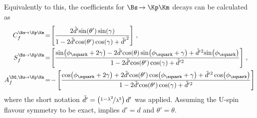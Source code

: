 Equivalently to this, the \CP coefficients for $\Bs\!\to\Kp\Km$ decays can be calculated as
\begin{equation}
\begin{aligned}
C_{f}^{\Bs\!\to\Kp\Km}&\!=\!\left[\frac{2\tilde{d'}\!\sin\!\left(\theta'\right)\sin\!\left(\gamma\right)}{1-2\tilde{d'}\!\cos\!\left(\theta'\right)\cos\!\left(\gamma\right)+\tilde{d'}^2}\right]\,,\\
S_{f}^{\Bs\!\to\Kp\Km}&\!=\!\left[\frac{\sin\!\left(\phi_\squark+2\gamma\right)-2\tilde{d'}\!\cos\!\left(\theta\right)\sin\!\left(\phi_\squark+\gamma\right)+\tilde{d'}{}^2\!\sin\!\left(\phi_\squark\right)}{1-2\tilde{d'}\!\cos\!\left(\theta'\right)\cos\!\left(\gamma\right)+\tilde{d'}{}^2}\right]\,,\\
A_f^{\DG, \Bs\!\to\Kp\Km}&\!=\!-\left[\frac{\cos\!\left(\phi_\squark+2\gamma\right)+2\tilde{d'}\!\cos\!\left(\theta'\right)\cos\!\left(\phi_\squark+\gamma\right)+\tilde{d'}{}^2\cos\!\left(\phi_\squark\right)}{1-2\tilde{d'}\!\cos\!\left(\theta'\right)\cos\!\left(\gamma\right)+\tilde{d'}{}^2}\right]
\end{aligned}
\end{equation}
where the short notation $\tilde{d'}=\left(\nicefrac{1-\lambda^2}{\lambda^2}\right)d'$ was applied.
Assuming the U-spin flavour symmetry to be exact, implies $d'=d$ and $\theta'=\theta$.


